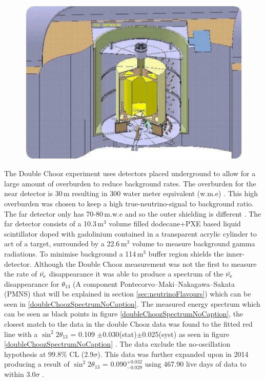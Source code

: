 \begin{figure}[!h]
 \centering
 \includegraphics[width=0.5\linewidth]{Chapter1/Figs/doublChoozDetectorDiagram.jpg} %
 \label{fig:DoubleChoozFarDetector}
\end{figure}
The Double Chooz experiment uses detectors placed underground to allow for a large amount of overburden to reduce background rates. The overburden for the near detector is 30\,m resulting in 300 water meter equivalent (w.m.e) \cite{lasserre2006}. This high overburden was chosen to keep a high true-neutrino-signal to background ratio. The far detector only has 70-80\,m.w.e and so the outer shielding is different \cite{lasserre2006}. The far detector consists of a 10.3\,m$^3$ volume filled dodecane+PXE based liquid scintillator doped with gadolinium contained in a transparent acrylic cylinder to act of a target, surrounded by a 22.6\,m$^3$ volume to measure background gamma radiations. To minimise background a 114\,m$^3$ buffer region shields the inner-detector. Although the Double Chooz measurement  was not the first to measure the rate of $\Bar{\nu_e}$ disappearance \cite{reno_may_2012} it was able to produce a spectrum of the $\Bar{\nu_e}$ disappearance for $\theta_{13}$ (A component Pontecorvo–Maki–Nakagawa–Sakata (PMNS) that will be explained in section \ref{sec:neutrinoFlavours}) which can be seen in \ref{doubleChoozSpectrumNoCaption}. The measured energy spectrum which can be seen as black points in figure \ref{doubleChoozSpectrumNoCaption}, the closest match to the data in the double Chooz data was found to the fitted red line with a $\sin^2{2\theta_{13}}$ = 0.109 $\pm$0.030(stat)$\pm$0.025(syst) as seen in figure \ref{doubleChoozSpectrumNoCaption} \cite{Abe_2012}. The data exclude the no-oscillation hypothesis at 99.8$\%$ CL (2.9$\sigma$)\cite{Abe_2012}. This data was further expanded upon in 2014 producing a result of $\sin^2{2\theta_{13}}$ = 0.090$^{+0.032}_{-0.029}$ using 467.90 live days of data to within $3.0\sigma$ \cite{abe2014improved}.
